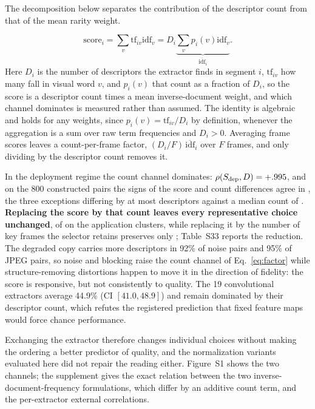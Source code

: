 The decomposition below separates the contribution of the descriptor count from that of
the mean rarity weight. 

\begin{equation}
\mathrm{score}_i=\sum_v\mathrm{tf}_{iv}\mathrm{idf}_v
=D_i\underbrace{\sum_v p_i(v)\mathrm{idf}_v}_{\overline{\mathrm{idf}}_i}.
\label{eq:factor}
\end{equation}
Here $D_i$ is the number of descriptors the extractor finds in segment $i$,
$\mathrm{tf}_{iv}$ how many fall in visual word $v$, and $p_i(v)$ that count as a fraction
of $D_i$, so the score is a descriptor count times a mean inverse-document weight,
and which channel dominates is measured rather than assumed. %
The identity is algebraic and holds for any weights, since $p_i(v)=\mathrm{tf}_{iv}/D_i$
by definition, whenever the aggregation is a sum over raw term frequencies and $D_i>0$.
Averaging frame scores leaves a count-per-frame factor, $(D_i/F)\,\overline{\mathrm{idf}}_i$
over $F$ frames, and only dividing by the descriptor count removes it.

In the deployment regime the count channel dominates: $\rho(S_{\mathrm{dep}},D)
=+.995{}$, and on the 800 constructed pairs the signs of the score and count differences
agree in \mecConcordam{}, the three exceptions differing by at most \excDelta{}
descriptors against a median count of \excMediana{}. \textbf{Replacing the score by that count leaves every representative choice unchanged}, \redEscolhas{} of \redDe{} on the application clusters, while replacing it by the number of key frames the selector retains preserves only \redQuadros{}; Table~S33 reports the reduction. The degraded copy carries more
descriptors in 92\% of noise pairs and 95\% of JPEG pairs, so noise and blocking
raise the count channel of Eq.~\ref{eq:factor} while structure-removing distortions
happen to move it in the direction of fidelity: the score is responsive, but not
consistently to quality. The 19 convolutional extractors average 44.9\% (CI $[41.0,48.9]$)
and remain dominated by their descriptor count, which refutes the registered
prediction that fixed feature maps would force chance performance.

Exchanging the extractor therefore changes individual choices without making the ordering
a better predictor of quality, and the normalization variants evaluated here did
not repair the reading either. Figure~S1 shows the two channels; the supplement gives the exact relation between the two inverse-document-frequency formulations, which differ by an additive count term, and the per-extractor external correlations.

